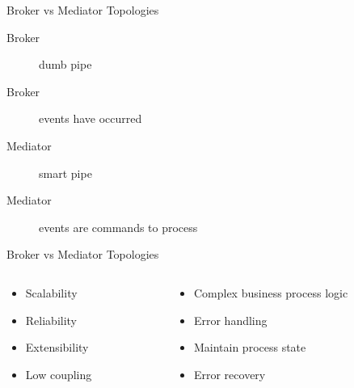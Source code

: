 \documentclass{slide}
\begin{document}
\begin{frame}{Broker vs Mediator Topologies}
    \vspace{1mm}
    {\LARGE
    \begin{description}
        \item[Broker] dumb pipe
        \vspace{3mm}
        \item[Broker] events have occurred
        \vspace{3mm}
        \item[Mediator] smart pipe
        \vspace{3mm}
        \item[Mediator] events are commands to process
    \end{description}
    }
\end{frame}

\begin{frame}{Broker vs Mediator Topologies}
    \vspace{1mm}
    \begin{columns}[t]
    \begin{column}{0.41\textwidth}
    {\LARGE
    \begin{itemize}
        \item Scalability
        \item Reliability
        \item Extensibility
        \item Low coupling
    \end{itemize}
    }
    \end{column}
    \begin{column}{0.59\textwidth}
    {\LARGE
    \begin{itemize}
        \item Complex business process logic
        \item Error handling
        \item Maintain process state
        \item Error recovery
    \end{itemize}
    }
    \end{column}
    \end{columns}
\end{frame}
\end{document}
